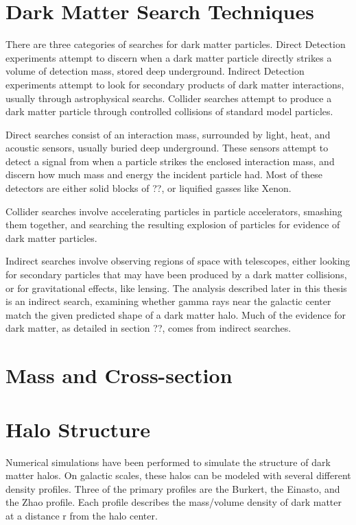\section{Dark Matter Search Techniques}


There are three categories of searches for dark matter particles.
Direct Detection experiments attempt to discern when a dark matter particle directly strikes a volume of detection mass, stored deep underground.
Indirect Detection experiments attempt to look for secondary products of dark matter interactions, usually through astrophysical searchs.
Collider searches attempt to produce a dark matter particle through controlled collisions of standard model particles.

Direct searches consist of an interaction mass, surrounded by light, heat, and acoustic sensors, usually buried deep underground.
These sensors attempt to detect a signal from when a particle strikes the enclosed interaction mass, and discern how much mass and energy the incident particle had.
Most of these detectors are either solid blocks of ??, or liquified gasses like Xenon.

Collider searches involve accelerating particles in particle accelerators, smashing them together, and searching the resulting explosion of particles for evidence of dark matter particles.

Indirect searches involve observing regions of space with telescopes, either looking for secondary particles that may have been produced by a dark matter collisions, or for gravitational effects, like lensing.
The analysis described later in this thesis is an indirect search, examining whether gamma rays near the galactic center match the given predicted shape of a dark matter halo.
Much of the evidence for dark matter, as detailed in section ??, comes from indirect searches.



\section{Mass and Cross-section}


\section{Halo Structure}
Numerical simulations have been performed to simulate the structure of dark matter halos.
On galactic scales, these halos can be modeled with several different density profiles.
Three of the primary profiles are the Burkert, the Einasto, and the Zhao profile.
Each profile describes the mass/volume density of dark matter at a distance r from the halo center.

